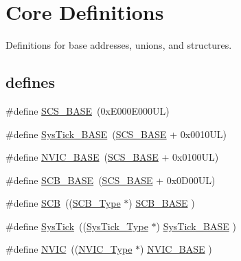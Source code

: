 \hypertarget{group___c_m_s_i_s__core__base}{}\section{Core Definitions}
\label{group___c_m_s_i_s__core__base}


Definitions for base addresses, unions, and structures.  


\subsection*{\textquotesingle{}defines\textquotesingle{}}
\begin{DoxyCompactItemize}
\item 
\#define \hyperlink{group___c_m_s_i_s__core__base_ga3c14ed93192c8d9143322bbf77ebf770}{S\+C\+S\+\_\+\+B\+A\+SE}~(0x\+E000\+E000\+U\+L)
\item 
\#define \hyperlink{group___c_m_s_i_s__core__base_ga58effaac0b93006b756d33209e814646}{Sys\+Tick\+\_\+\+B\+A\+SE}~(\hyperlink{group___c_m_s_i_s__core__base_ga3c14ed93192c8d9143322bbf77ebf770}{S\+C\+S\+\_\+\+B\+A\+SE} +  0x0010\+U\+L)
\item 
\#define \hyperlink{group___c_m_s_i_s__core__base_gaa0288691785a5f868238e0468b39523d}{N\+V\+I\+C\+\_\+\+B\+A\+SE}~(\hyperlink{group___c_m_s_i_s__core__base_ga3c14ed93192c8d9143322bbf77ebf770}{S\+C\+S\+\_\+\+B\+A\+SE} +  0x0100\+U\+L)
\item 
\#define \hyperlink{group___c_m_s_i_s__core__base_gad55a7ddb8d4b2398b0c1cfec76c0d9fd}{S\+C\+B\+\_\+\+B\+A\+SE}~(\hyperlink{group___c_m_s_i_s__core__base_ga3c14ed93192c8d9143322bbf77ebf770}{S\+C\+S\+\_\+\+B\+A\+SE} +  0x0\+D00\+U\+L)
\item 
\#define \hyperlink{group___c_m_s_i_s__core__base_gaaaf6477c2bde2f00f99e3c2fd1060b01}{S\+CB}~((\hyperlink{struct_s_c_b___type}{S\+C\+B\+\_\+\+Type}       $\ast$)     \hyperlink{group___c_m_s_i_s__core__base_gad55a7ddb8d4b2398b0c1cfec76c0d9fd}{S\+C\+B\+\_\+\+B\+A\+SE}      )
\item 
\#define \hyperlink{group___c_m_s_i_s__core__base_gacd96c53beeaff8f603fcda425eb295de}{Sys\+Tick}~((\hyperlink{struct_sys_tick___type}{Sys\+Tick\+\_\+\+Type}   $\ast$)     \hyperlink{group___c_m_s_i_s__core__base_ga58effaac0b93006b756d33209e814646}{Sys\+Tick\+\_\+\+B\+A\+SE}  )
\item 
\#define \hyperlink{group___c_m_s_i_s__core__base_gac8e97e8ce56ae9f57da1363a937f8a17}{N\+V\+IC}~((\hyperlink{struct_n_v_i_c___type}{N\+V\+I\+C\+\_\+\+Type}      $\ast$)     \hyperlink{group___c_m_s_i_s__core__base_gaa0288691785a5f868238e0468b39523d}{N\+V\+I\+C\+\_\+\+B\+A\+SE}     )

\end{DoxyCompactItemize}
